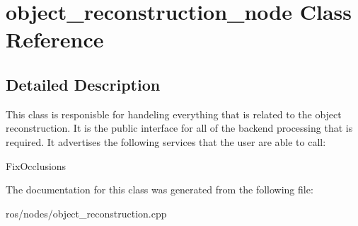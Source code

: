 \hypertarget{classobject__reconstruction__node}{\section{object\-\_\-reconstruction\-\_\-node \-Class \-Reference}
\label{classobject__reconstruction__node}
}


\subsection{\-Detailed \-Description}
\-This class is responisble for handeling everything that is related to the object reconstruction. \-It is the public interface for all of the backend processing that is required. \-It advertises the following services that the user are able to call\-:


\begin{DoxyItemize}
\item \-Fix\-Occlusions 
\end{DoxyItemize}

\-The documentation for this class was generated from the following file\-:\begin{DoxyCompactItemize}
\item 
ros/nodes/object\-\_\-reconstruction.\-cpp\end{DoxyCompactItemize}
